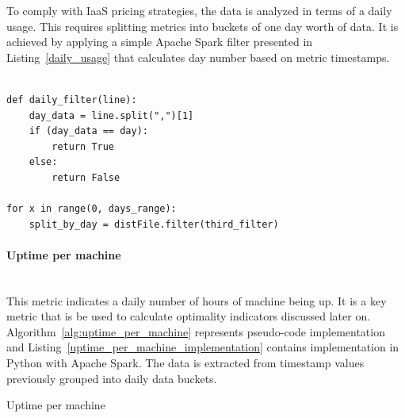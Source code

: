 \documentclass[]{final_report}
\newcommand{\myparagraph}[1]{\paragraph{#1}\mbox{}\\}
\begin{document}
To comply with IaaS pricing strategies, the data is analyzed in terms of a daily usage. This requires splitting metrics into buckets of one day worth of data. 
It is achieved by applying a simple Apache Spark filter presented in Listing~\ref{daily_usage} that calculates day number based on metric timestamps.

\begin{lstlisting}[label={daily_usage},caption={Daily usage filter},frame=single]

def daily_filter(line):
    day_data = line.split(",")[1]
    if (day_data == day):
        return True
    else:
        return False

for x in range(0, days_range):
    split_by_day = distFile.filter(third_filter)

\end{lstlisting} 


\myparagraph{Uptime per machine}

This metric indicates a daily number of hours of machine being up. It is a key metric that is be used to calculate optimality indicators discussed later on. Algorithm~\ref{alg:uptime_per_machine} represents pseudo-code implementation and Listing~\ref{uptime_per_machine_implementation} contains implementation in Python with Apache Spark. The data is extracted from timestamp values previously grouped into daily data buckets.

\begin{algorithm}[h]
\caption{Uptime per machine}
\label{alg:uptime_per_machine}
 \algrenewcommand{}
 \algrenewcommand{}
\end{algorithm}
\end{document}
